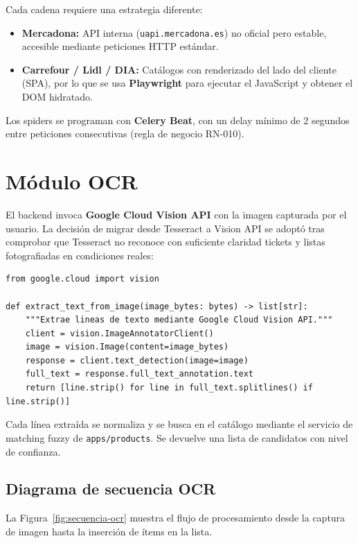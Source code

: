 Cada cadena requiere una estrategia diferente:

\begin{itemize}
  \item \textbf{Mercadona:} API interna (\texttt{uapi.mercadona.es}) no oficial pero estable,
    accesible mediante peticiones HTTP est\'andar.
  \item \textbf{Carrefour / Lidl / DIA:} Cat\'alogos con renderizado del lado del cliente (SPA),
    por lo que se usa \textbf{Playwright} para ejecutar el JavaScript y obtener el DOM hidratado.
\end{itemize}

Los spiders se programan con \textbf{Celery Beat}, con un delay m\'inimo de 2 segundos entre
peticiones consecutivas (regla de negocio RN-010).

\section{M\'odulo OCR}\label{sec:ocr}

El backend invoca \textbf{Google Cloud Vision API} con la imagen capturada por el usuario. La
decisi\'on de migrar desde Tesseract a Vision API se adopt\'o tras comprobar que Tesseract no
reconoce con suficiente claridad tickets y listas fotografiadas en condiciones reales:

\begin{verbatim}
from google.cloud import vision

def extract_text_from_image(image_bytes: bytes) -> list[str]:
    """Extrae lineas de texto mediante Google Cloud Vision API."""
    client = vision.ImageAnnotatorClient()
    image = vision.Image(content=image_bytes)
    response = client.text_detection(image=image)
    full_text = response.full_text_annotation.text
    return [line.strip() for line in full_text.splitlines() if line.strip()]
\end{verbatim}

Cada l\'inea extra\'ida se normaliza y se busca en el cat\'alogo mediante el servicio de matching
fuzzy de \texttt{apps/products}. Se devuelve una lista de candidatos con nivel de confianza.

\subsection{Diagrama de secuencia OCR}\label{subsec:secuencia-ocr}

La Figura~\ref{fig:secuencia-ocr} muestra el flujo de procesamiento desde la captura de imagen
hasta la inserci\'on de \'items en la lista.


